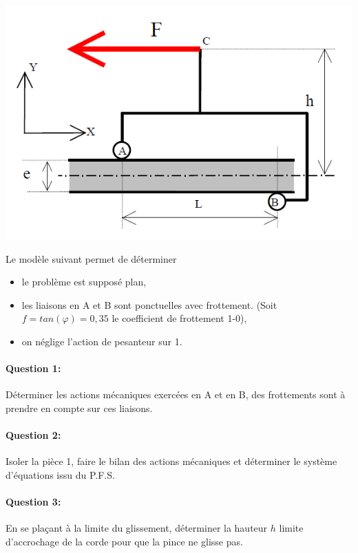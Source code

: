 \begin{minipage}{0.4\linewidth}
   \centering\includegraphics[width=\linewidth]{img/cordeuse_cin.png}
 \end{minipage}
 \hfill
  \begin{minipage}{0.58\linewidth}
Le modèle suivant permet de déterminer
 \begin{itemize}
  \item le problème est supposé plan,
  \item les liaisons en A et B sont ponctuelles avec frottement. (Soit $f=tan(\varphi)=0,35$ le coefficient de frottement 1-0),
  \item on néglige l'action de pesanteur sur 1.
 \end{itemize}
  \end{minipage}

\paragraph{Question 1:} Déterminer les actions mécaniques exercées en A et en B, des frottements sont à prendre en compte sur ces liaisons.

\paragraph{Question 2:} Isoler la pièce 1, faire le bilan des actions mécaniques et déterminer le système d'équations issu du P.F.S.

\paragraph{Question 3:} En se plaçant à la limite du glissement, déterminer la hauteur $h$ limite d'accrochage de la corde pour que la pince ne glisse pas.

